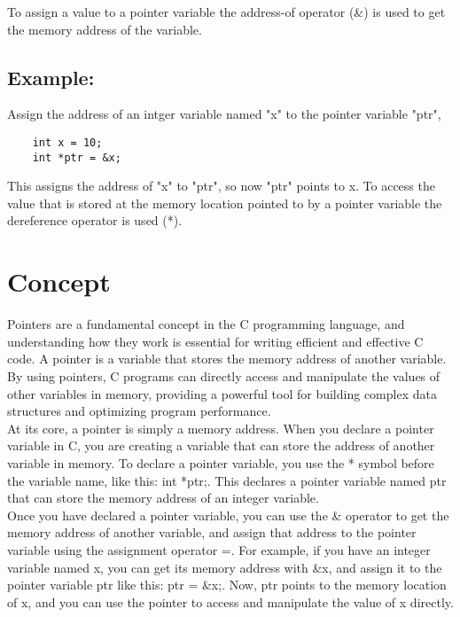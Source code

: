 \documentclass[12pt, letterpaper]{report}
\begin{document}
To assign  a value to a pointer variable the address-of operator (\&) is used 
to get the memory address of the variable.\\

\subsection*{Example:}
Assign the address of an intger variable named "x" to the pointer variable 
"ptr",
\begin{lstlisting}
	int x = 10;
	int *ptr = &x;
\end{lstlisting}
This assigns the address of "x" to "ptr", so now "ptr" points to x.
To access the value that is stored at the memory location pointed to by a
pointer variable the dereference operator is used (*).\\

\section{Concept}
Pointers are a fundamental concept in the C programming language, 
and understanding how they work is essential for writing efficient and 
effective C code. A pointer is a variable that stores the memory address of 
another variable. By using pointers, C programs can directly access and 
manipulate the values of other variables in memory, providing a powerful tool 
for building complex data structures and optimizing program performance.\\

At its core, a pointer is simply a memory address. When you declare a pointer 
variable in C, you are creating a variable that can store the address of 
another variable in memory. To declare a pointer variable, you use the * 
symbol before the variable name, like this: int *ptr;. This declares a pointer
variable named ptr that can store the memory address of an integer variable.\\

Once you have declared a pointer variable, you can use the \& operator to get 
the memory address of another variable, and assign that address to the pointer
variable using the assignment operator =. For example, if you have an integer 
variable named x, you can get its memory address with \&x, and assign it to the 
pointer variable ptr like this: ptr = \&x;. Now, ptr points to the memory 
location of x, and you can use the pointer to access and manipulate the value 
of x directly.\\
\end{document}
